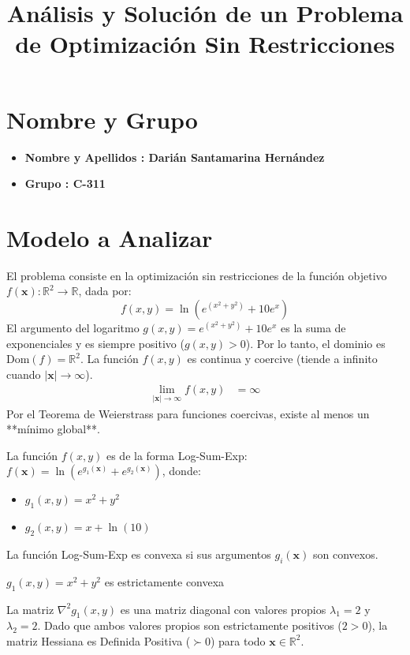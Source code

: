 \documentclass{article}
\title{Análisis y Solución de un Problema de Optimización Sin Restricciones}
\begin{document}
\maketitle

\section{Nombre y Grupo}
\begin{itemize}
 \item \textbf{Nombre y Apellidos : Darián Santamarina Hernández} 
  \item \textbf{Grupo : C-311} 
\end{itemize}
\section{Modelo a Analizar}

El problema consiste en la optimización sin restricciones de la función objetivo $f(\mathbf{x}): \mathbb{R}^2 \to \mathbb{R}$, dada por:
$$f(x, y) = \ln\left(e^{(x^2+y^2)} + 10e^x\right)$$
El argumento del logaritmo $g(x,y) = e^{(x^2+y^2)} + 10e^x$ es la suma de exponenciales y es siempre positivo ($g(x,y) > 0$). Por lo tanto, el dominio es $\text{Dom}(f) = \mathbb{R}^2$.
La función $f(x,y)$ es continua y coercive (tiende a infinito cuando $|\mathbf{x}| \to \infty$).
    \begin{align*}
        \lim_{|\mathbf{x}| \to \infty} f(x, y) &= \infty
    \end{align*}
    Por el Teorema de Weierstrass para funciones coercivas, existe al menos un **mínimo global**.

La función $f(x,y)$ es de la forma Log-Sum-Exp: $f(\mathbf{x}) = \ln\left(e^{g_1(\mathbf{x})} + e^{g_2(\mathbf{x})}\right)$, donde:
\begin{itemize}
    \item $g_1(x,y) = x^2+y^2$
    \item $g_2(x,y) = x + \ln(10)$
\end{itemize}
La función Log-Sum-Exp es convexa si sus argumentos $g_i(\mathbf{x})$ son convexos.

$g_1(x,y) = x^2+y^2$ es estrictamente convexa 

La matriz $\nabla^2 g_1(x,y)$ es una matriz diagonal con valores propios $\lambda_1 = 2$ y $\lambda_2 = 2$. Dado que ambos valores propios son estrictamente positivos ($2 > 0$), la matriz Hessiana es Definida Positiva ($\succ 0$) para todo $\mathbf{x} \in \mathbb{R}^2$.
\end{document}
